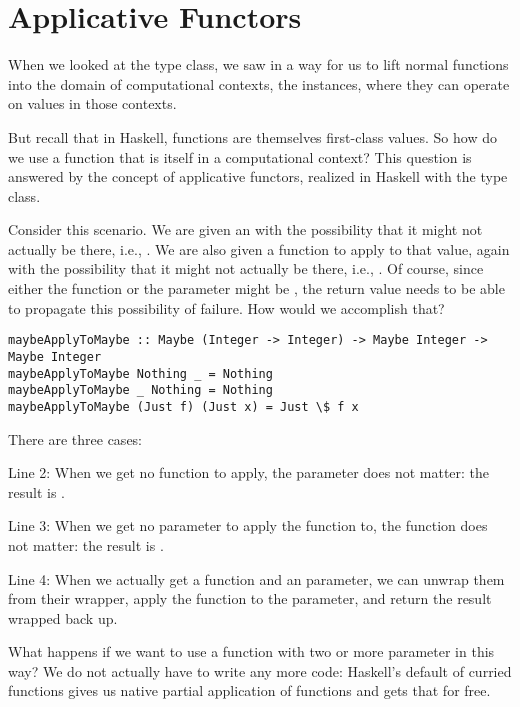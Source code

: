 \section{Applicative Functors}

When we looked at the  type class, we saw in  a way for us to lift
normal functions into the domain of computational contexts, the  instances, where
they can operate on values in those contexts.

But recall that in Haskell, functions are themselves first-class values. So how do we use a function
that is itself in a computational context? This question is answered by the concept of applicative
functors, realized in Haskell with the  type class.

Consider this scenario. We are given an  with the possibility that it might not
actually be there, i.e., . We are also given a function to apply to that value,
again with the possibility that it might not actually be there, i.e., .
Of course, since either the function or the parameter might be , the return value needs
to be able to propagate this possibility of failure. How would we accomplish that?

\begin{lstlisting}
maybeApplyToMaybe :: Maybe (Integer -> Integer) -> Maybe Integer -> Maybe Integer
maybeApplyToMaybe Nothing _ = Nothing
maybeApplyToMaybe _ Nothing = Nothing
maybeApplyToMaybe (Just f) (Just x) = Just \$ f x
\end{lstlisting}

There are three cases:

\begin{notelist}
    \item Line 2: When we get no function to apply, the parameter does not matter: the result is .
    \item Line 3: When we get no parameter to apply the function to, the function does not matter: the result is .
    \item Line 4: When we actually get a function and an parameter, we can unwrap them from their  wrapper,
          apply the function to the parameter, and return the result wrapped back up.
\end{notelist}

What happens if we want to use a function with two or more parameter in this way? We do not actually have to write any more
code: Haskell's default of curried functions gives us native partial application of functions and 
gets that for free.

